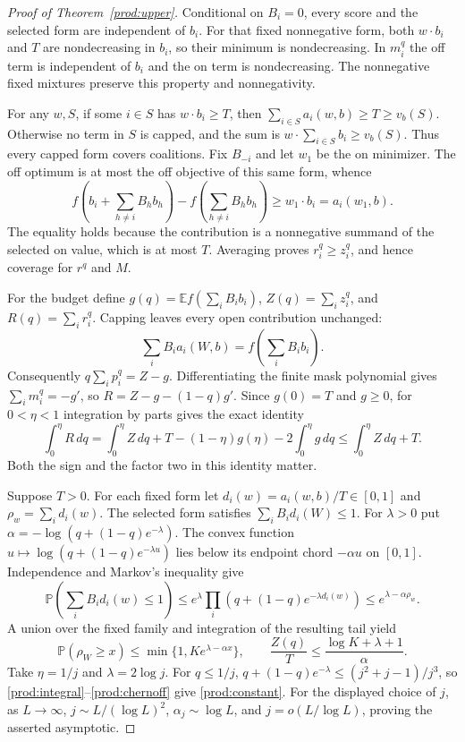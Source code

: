 \documentclass[11pt]{article}
\theoremstyle{definition}\newtheorem{definition}[theorem]{Definition}
\theoremstyle{remark}\newtheorem{remark}[theorem]{Remark}
\newcommand{\E}{\mathbb E}
\newcommand{\Prob}{\mathbb P}
\begin{document}
\begin{proof}[Proof of Theorem~\ref{prod:upper}]
Conditional on $B_i=0$, every score and the selected form are independent of
$b_i$. For that fixed nonnegative form, both $w\cdot b_i$ and $T$ are
nondecreasing in $b_i$, so their minimum is nondecreasing. In $m_i^q$ the
off term is independent of $b_i$ and the on term is nondecreasing. The
nonnegative fixed mixtures preserve this property and nonnegativity.

For any $w,S$, if some $i\in S$ has $w\cdot b_i\ge T$, then
$\sum_{i\in S}a_i(w,b)\ge T\ge v_b(S)$. Otherwise no term in $S$ is capped,
and the sum is $w\cdot\sum_{i\in S}b_i\ge v_b(S)$. Thus every capped form
covers coalitions. Fix $B_{-i}$ and let $w_1$ be the on minimizer. The off
optimum is at most the off objective of this same form, whence
\begin{equation}\label{prod:endpoint}
 f\left(b_i+\sum_{h\ne i}B_hb_h\right)-f\left(\sum_{h\ne i}B_hb_h\right)
 \ge w_1\cdot b_i=a_i(w_1,b).
\end{equation}
The equality holds because the contribution is a nonnegative summand of
the selected on value, which is at most $T$. Averaging proves $r_i^q\ge z_i^q$,
and hence coverage for $r^q$ and $M$.

For the budget define $g(q)=\E f(\sum_iB_ib_i)$, $Z(q)=\sum_i z_i^q$,
and $R(q)=\sum_i r_i^q$. Capping leaves every open contribution unchanged:
\[
 \sum_iB_i a_i(W,b)=f\left(\sum_iB_ib_i\right).
\]
Consequently $q\sum_i p_i^q=Z-g$. Differentiating the finite mask polynomial
gives $\sum_i m_i^q=-g'$, so $R=Z-g-(1-q)g'$. Since $g(0)=T$ and $g\ge0$,
for $0<\eta<1$ integration by parts gives the exact identity
\begin{equation}\label{prod:integral}
 \int_0^\eta R\,dq=\int_0^\eta Z\,dq+T-(1-\eta)g(\eta)
                         -2\int_0^\eta g\,dq
 \le\int_0^\eta Z\,dq+T.
\end{equation}
Both the sign and the factor two in this identity matter.

Suppose $T>0$. For each fixed form let
$d_i(w)=a_i(w,b)/T\in[0,1]$ and $\rho_w=\sum_i d_i(w)$.
The selected form satisfies $\sum_iB_id_i(W)\le1$. For $\lambda>0$ put
$\alpha=-\log(q+(1-q)e^{-\lambda})$. The convex function
$u\mapsto\log(q+(1-q)e^{-\lambda u})$ lies below its endpoint chord
$-\alpha u$ on $[0,1]$. Independence and Markov's inequality give
\[
 \Prob\left(\sum_iB_id_i(w)\le1\right)
 \le e^\lambda\prod_i(q+(1-q)e^{-\lambda d_i(w)})
 \le e^{\lambda-\alpha\rho_w}.
\]
A union over the fixed family and integration of the resulting tail yield
\begin{equation}\label{prod:chernoff}
 \Prob(\rho_W\ge x)\le\min\{1,K e^{\lambda-\alpha x}\},\qquad
 \frac{Z(q)}T\le\frac{\log K+\lambda+1}{\alpha}.
\end{equation}
Take $\eta=1/j$ and $\lambda=2\log j$. For $q\le1/j$,
$q+(1-q)e^{-\lambda}\le(j^2+j-1)/j^3$, so
\eqref{prod:integral}--\eqref{prod:chernoff} give \eqref{prod:constant}.
For the displayed choice of $j$, as $L\to\infty$,
$j\sim L/(\log L)^2$, $\alpha_j\sim\log L$, and
$j=o(L/\log L)$, proving the asserted asymptotic.


\end{proof}
\end{document}
